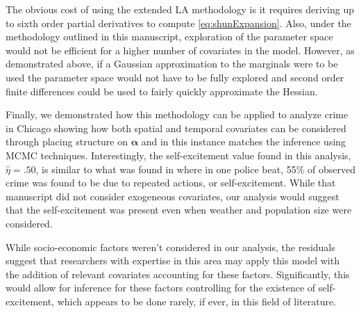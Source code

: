 \documentclass[11pt]{isuthesis}
\begin{document}
	The obvious cost of using the extended LA methodology is it requires deriving up to sixth order partial derivatives to compute \eqref{eq:shunExpansion}.  Also, under the methodology outlined in this manuscript, exploration of the parameter space would not be efficient for a higher number of covariates in the model.  However, as demonstrated above, if a Gaussian approximation to the marginals were to be used the parameter space would not have to be fully explored and second order finite differences could be used to fairly quickly approximate the Hessian.
	
	Finally, we demonstrated how this methodology can be applied to analyze crime in Chicago showing how both spatial and temporal covariates can be considered through placing structure on $\boldsymbol{\alpha}$ and in this instance matches the inference using MCMC techniques.  Interestingly, the self-excitement value found in this analysis, $\hat{\eta}=.50$, is similar to what was found in \cite{mohler2013modeling} where in one police beat, 55\% of observed crime was found to be due to repeated actions, or self-excitement.  While that manuscript did not consider exogeneous covariates, our analysis would suggest that the self-excitement was present even when weather and population size were considered.  
	
	While socio-economic factors weren't considered in our analysis, the residuals suggest that researchers with expertise in this area may apply this model with the addition of relevant covariates accounting for these factors.  Significantly, this would allow for inference for these factors controlling for the existence of self-excitement, which appears to be done rarely, if ever, in this field of literature. 




\end{document}
